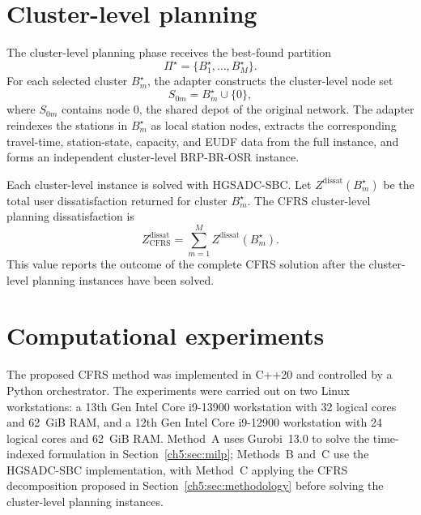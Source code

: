 \section{Cluster-level planning}\label{ch5:sec:cluster-level-planning}\label{ch5:sec:routing-interface}

The cluster-level planning phase receives the best-found partition
\begin{equation}
\Pi^\star=\{B_1^\star,\ldots,B_M^\star\}.
\label{ch5:eq:best-found-partition}
\end{equation}
For each selected cluster
$B_m^\star$, the adapter constructs the cluster-level node set
\begin{equation}
S_{0m}=B_m^\star\cup\{0\},
\label{ch5:eq:cfrs-cluster-node-set}
\end{equation}
where $S_{0m}$ contains node $0$, the shared depot of the original network. The adapter reindexes
the stations in $B_m^\star$ as local station nodes, extracts the corresponding
travel-time, station-state, capacity, and EUDF data from the full instance, and
forms an independent cluster-level BRP-BR-OSR instance.

Each cluster-level instance is solved with HGSADC-SBC. Let
$Z^{\mathrm{dissat}}(B_m^\star)$ be the total user dissatisfaction returned for
cluster $B_m^\star$. The CFRS
cluster-level planning dissatisfaction is
\begin{equation}
Z_{\mathrm{CFRS}}^{\mathrm{dissat}}
=\sum_{m=1}^{M}Z^{\mathrm{dissat}}(B_m^\star).
\label{ch5:eq:cfrs-total-dissat}
\end{equation}
This value reports the outcome of the complete CFRS solution after the
cluster-level planning instances have been solved.


\section{Computational experiments}\label{ch5:sec:computational-experiments}\label{ch5:sec:experiments}

The proposed CFRS method was implemented in C++20 and controlled by a Python
orchestrator. The experiments were carried out on two Linux workstations: a 13th
Gen Intel Core i9-13900 workstation with 32 logical cores and 62~GiB RAM, and a
12th Gen Intel Core i9-12900 workstation with 24 logical cores and 62~GiB RAM.
Method~A uses Gurobi~13.0 to solve the time-indexed formulation in
Section~\ref{ch5:sec:milp}; Methods~B and~C use the HGSADC-SBC implementation,
with Method~C applying the CFRS decomposition proposed in
Section~\ref{ch5:sec:methodology} before solving the cluster-level planning
instances.

